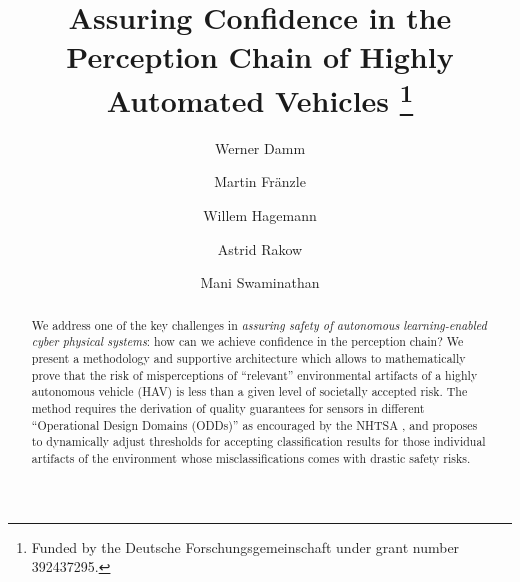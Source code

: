 \documentclass[runningheads]{llncs}
\begin{document}
%
\title{Assuring Confidence in the Perception Chain of Highly Automated Vehicles
\thanks{Funded by the Deutsche Forschungsgemeinschaft under grant number 392437295.}}
%
%
\author{Werner Damm \and
Martin Fr\"anzle  \and
Willem Hagemann  \and
Astrid Rakow  \and
Mani Swaminathan }
%
%
%
\maketitle              %
%
\begin{abstract}
We address one of the key challenges in \emph{assuring safety of autonomous} \emph{learning-enabled cyber physical systems}: how can we achieve confidence in the perception chain? We present a methodology and supportive architecture which allows to mathematically prove that the risk of misperceptions of \enquote{relevant} environmental artifacts of a highly autonomous vehicle (HAV) is less than a given level of societally accepted risk. The method requires the derivation of quality guarantees for sensors in different \enquote{Operational Design Domains (ODDs)}  as encouraged by the NHTSA \cite{NHTSF}, and proposes to dynamically adjust thresholds for accepting classification results for those individual artifacts of the environment whose misclassifications comes with drastic safety risks. 

\end{abstract}
%
%










\end{document}
